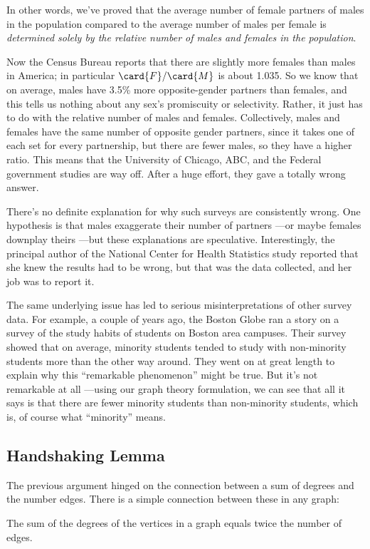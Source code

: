 In other words, we've proved that the average number of female partners of males in the
population compared to the average number of males per female is \emph{determined
solely by the relative number of males and females in the population}.

Now the Census Bureau reports that there are slightly more females than males in
America; in particular $\card{F} / \card{M}$ is about 1.035.  So we know that on
average, males have 3.5\% more opposite-gender partners than females, and this tells us
nothing about any sex's promiscuity or selectivity.  Rather, it just has to do with the
relative number of males and females.  Collectively, males and females have the same
number of opposite gender partners, since it takes one of each set for every
partnership, but there are fewer males, so they have a higher ratio.  This means that
the University of Chicago, ABC, and the Federal government studies are way off.  After
a huge effort, they gave a totally wrong answer.

There's no definite explanation for why such surveys are consistently wrong.  One
hypothesis is that males exaggerate their number of partners ---or maybe females
downplay theirs ---but these explanations are speculative.  Interestingly, the
principal author of the National Center for Health Statistics study reported that she
knew the results had to be wrong, but that was the data collected, and her job was to
report it.

The same underlying issue has led to serious misinterpretations of other survey data.
For example, a couple of years ago, the Boston Globe ran a story on a survey of the
study habits of students on Boston area campuses.  Their survey showed that on average,
minority students tended to study with non-minority students more than the other way
around.  They went on at great length to explain why this ``remarkable phenomenon''
might be true.  But it's not remarkable at all ---using our graph theory formulation,
we can see that all it says is that there are fewer minority students than non-minority
students, which is, of course what ``minority'' means.

\subsection{Handshaking Lemma}
The previous argument hinged on the connection between a sum of degrees and the number
edges.  There is a simple connection between these in any graph:

\begin{lemma}\label{sumedges}
The sum of the degrees of the vertices in a graph equals twice the number of edges.
\end{lemma}

